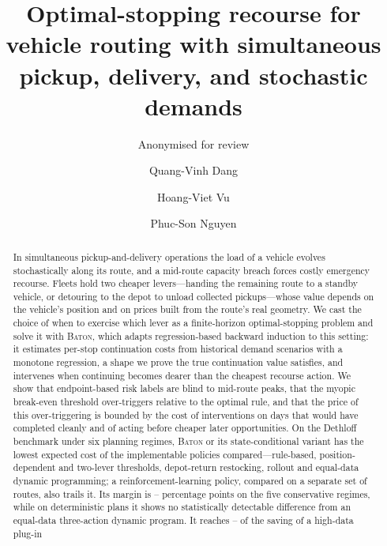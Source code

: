 \documentclass[preprint,authoryear,12pt]{elsarticle}
\theoremstyle{definition}
\theoremstyle{remark}
\begin{document}
\begin{frontmatter}

\title{Optimal-stopping recourse for vehicle routing with
simultaneous pickup, delivery, and stochastic demands}

\ifanon
  \author{Anonymised for review}
\else
  \author[buv]{Quang-Vinh Dang}
  \author[buv]{Hoang-Viet Vu}
  \author[ueh]{Phuc-Son Nguyen}
  \address[buv]{British University Vietnam, Hung Yen, Vietnam}
  \address[ueh]{University of Economics Ho Chi Minh City, Ho Chi Minh City, Vietnam}
\fi

\begin{abstract}
In simultaneous pickup-and-delivery operations the load of a vehicle
evolves stochastically along its route, and a mid-route capacity breach
forces costly emergency recourse. Fleets hold two cheaper
levers---handing the remaining route to a standby vehicle, or detouring
to the depot to unload collected pickups---whose value depends on the
vehicle's position and on prices built from the route's real geometry.
We cast the choice of when to exercise which lever as a finite-horizon
optimal-stopping problem and solve it with \textsc{Baton}, which adapts
regression-based backward induction to this setting: it estimates
per-stop continuation costs from historical demand scenarios with a
monotone regression, a shape we prove the true continuation value
satisfies, and intervenes when continuing becomes dearer than the
cheapest recourse action. We show that endpoint-based risk labels are
blind to mid-route peaks, that the myopic break-even threshold
over-triggers relative to the optimal rule, and that the price of this
over-triggering is bounded by the cost of interventions on days that
would have completed cleanly and of acting before cheaper later
opportunities. On the Dethloff benchmark under six planning regimes,
\textsc{Baton} or its state-conditional variant has the lowest expected
cost of the implementable policies compared---rule-based,
position-dependent and two-lever thresholds, depot-return restocking,
rollout and equal-data dynamic programming; a reinforcement-learning
policy, compared on a separate set of routes, also trails it. Its
margin is \statConsDeltaMin--\statConsDeltaMax{} percentage points on the
five conservative regimes, while on deterministic plans it shows no
statistically detectable difference from an equal-data three-action
dynamic program. It reaches
\ratioDpThreeLo--\ratioDpThreeHi{} of the saving of a high-data plug-in

\end{abstract}
\end{frontmatter}
\end{document}
